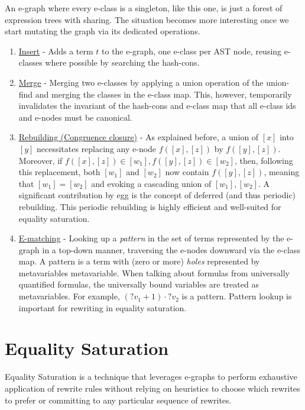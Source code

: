 An e-graph where every e-class is a singleton, like this one, is just a forest of expression trees with sharing.
The situation becomes more interesting once we start mutating the graph via its dedicated operations.

\begin{enumerate}
\item \underline{Insert} - Adds a term $t$ to the e-graph, one e-class per AST node, reusing e-classes where possible by searching the hash-cons.
\item \underline{Merge} - Merging two e-classes by applying a union operation of the union-find and merging the classes in the e-class map.
This, however, temporarily invalidates the invariant of the hash-cons and e-class map that all e-class ids and e-nodes must be canonical.
\item \underline{Rebuilding (Congruence closure)} - As explained before, a union of $[x]$ into $[y]$ necessitates replacing any e-node $f([x],[z])$ by $f([y],[z])$.
Moreover, if $f([x],[z])\in[w_1], f([y],[z])\in[w_2]$,
then, following this replacement, both $[w_1]$ and $[w_2]$ now contain
$f([y],[z])$, meaning that $[w_1] = [w_2]$ and evoking a cascading union of $[w_1], [w_2]$.
A significant contribution by egg is the concept of deferred (and thus periodic) rebuilding.
This periodic rebuilding is highly efficient and well-suited for equality saturation.
\item  \underline{E-matching} - Looking up a \emph{pattern} in the set of terms represented by the e-graph in a top-down manner, traversing the e-nodes downward via the e-class map.
A pattern is a term with (zero or more) \emph{holes} represented by metavariables \gls{metavariable}.
When talking about formulas from universally quantified formulas, the universally bound variables are treated as metavariables.
For example, $(?v_1+1)\cdot ?v_2$ is a pattern.
Pattern lookup is important for rewriting in equality saturation.
\end{enumerate}

\section{Equality Saturation}

Equality Saturation is a technique that leverages e-graphs to perform exhaustive application of rewrite rules without relying on heuristics to choose which rewrites to prefer or committing to any particular sequence of rewrites.

